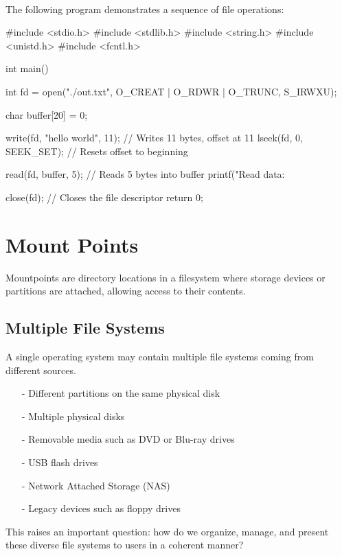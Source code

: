 \documentclass[../../compsys.tex]{subfiles}
\begin{document}
\newpage
\begin{example}
  \leavevmode \\[5px]
\upshape
The following program demonstrates a sequence of file operations:
\begin{cc}
#include <stdio.h>
#include <stdlib.h>
#include <string.h>
#include <unistd.h>
#include <fcntl.h>

int main() {
    int fd = open("./out.txt", O_CREAT | O_RDWR | O_TRUNC, S_IRWXU);

    char buffer[20] = {0};

    write(fd, "hello world", 11);      // Writes 11 bytes, offset at 11
    lseek(fd, 0, SEEK_SET);            // Resets offset to beginning

    read(fd, buffer, 5);               // Reads 5 bytes into buffer
    printf("Read data: %

    close(fd);                         // Closes the file descriptor
    return 0;
}
\end{cc}
\end{example}

\section{Mount Points}
Mountpoints are directory locations in a filesystem where storage devices or partitions are attached, allowing access to their contents.
\subsection{Multiple File Systems}
A single operating system may contain multiple file systems coming from different sources.\\
\begin{itemize}[itemsep=2pt, topsep=1pt]
    \item[-]Different partitions on the same physical disk
    \item[-]Multiple physical disks
    \item[-]Removable media such as DVD or Blu-ray drives
    \item[-]USB flash drives
    \item[-]Network Attached Storage (NAS)
    \item[-]Legacy devices such as floppy drives
\end{itemize}

This raises an important question: how do we organize, manage, and present these diverse file systems to users in a coherent manner?
\end{document}
